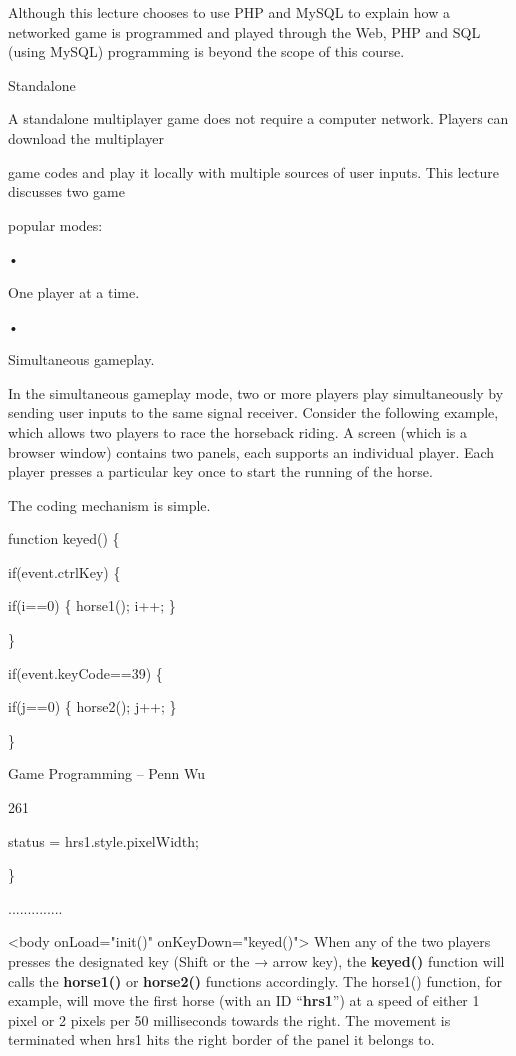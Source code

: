 \documentclass[
]{article}
\begin{document}
Although this lecture chooses to use PHP and MySQL to explain how a
networked game is programmed and played through the Web, PHP and SQL
(using MySQL) programming is beyond the scope of this course.

Standalone

A standalone multiplayer game does not require a computer network.
Players can download the multiplayer

game codes and play it locally with multiple sources of user inputs.
This lecture discusses two game

popular modes:

•

One player at a time.

•

Simultaneous gameplay.

In the simultaneous gameplay mode, two or more players play
simultaneously by sending user inputs to the same signal receiver.
Consider the following example, which allows two players to race the
horseback riding. A screen (which is a browser window) contains two
panels, each supports an individual player. Each player presses a
particular key once to start the running of the horse.

The coding mechanism is simple.

function keyed() \{

if(event.ctrlKey) \{

if(i==0) \{ horse1(); i++; \}

\}

if(event.keyCode==39) \{

if(j==0) \{ horse2(); j++; \}

\}

Game Programming -- Penn Wu

261

\protect\hypertarget{index_split_014.htmlux5cux23p262}{}{}

status = hrs1.style.pixelWidth;

\}

..............

\textless body onLoad="init()" onKeyDown="keyed()"\textgreater{} When
any of the two players presses the designated key (Shift or the → arrow
key), the \textbf{keyed()} function will calls the \textbf{horse1()} or
\textbf{horse2()} functions accordingly. The horse1() function, for
example, will move the first horse (with an ID ``\textbf{hrs1}'') at a
speed of either 1 pixel or 2 pixels per 50 milliseconds towards the
right. The movement is terminated when hrs1 hits the right border of the
panel it belongs to.
\end{document}

